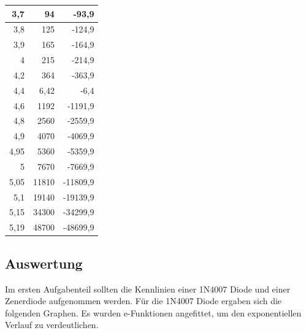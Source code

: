 \documentclass[12pt,a4paper]{article}
\begin{document}
\begin{table}[H]
\begin{center}
\begin{tabular}{|r|r|r|}
3,7 & 94 & -93,9 \\ \hline
3,8 & 125 & -124,9 \\ \hline
3,9 & 165 & -164,9 \\ \hline
4 & 215 & -214,9 \\ \hline
4,2 & 364 & -363,9 \\ \hline
4,4 & 6,42 & -6,4 \\ \hline
4,6 & 1192 & -1191,9 \\ \hline
4,8 & 2560 & -2559,9 \\ \hline
4,9 & 4070 & -4069,9 \\ \hline
4,95 & 5360 & -5359,9 \\ \hline
5 & 7670 & -7669,9 \\ \hline
5,05 & 11810 & -11809,9 \\ \hline
5,1 & 19140 & -19139,9 \\ \hline
5,15 & 34300 & -34299,9 \\ \hline
5,19 & 48700 & -48699,9 \\ \hline
\end{tabular}
\end{center}
\label{tab:a2_2}
\end{table}



\subsection{Auswertung}

Im ersten Aufgabenteil sollten die Kennlinien einer 1N4007 Diode und einer Zenerdiode aufgenommen werden. Für die 1N4007 Diode ergaben sich die folgenden Graphen. Es wurden e-Funktionen angefittet, um den exponentiellen Verlauf zu verdeutlichen.
\end{document}
